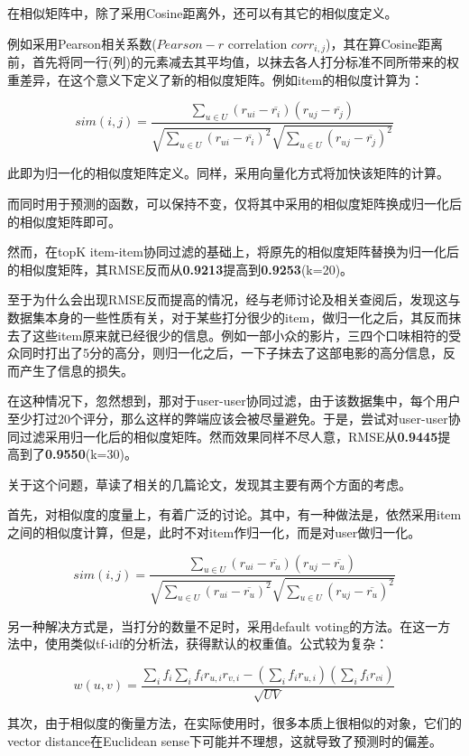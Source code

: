 \documentclass[utf8, a4paper, 11pt, onecolumn]{ctexart}
\begin{document}
\begin{spacing}{1.3}
在相似矩阵中，除了采用Cosine距离外，还可以有其它的相似度定义。

例如采用Pearson相关系数($Pearson-r$ correlation $corr_{i,j}$)\cite{sarwar2001item}，其在算Cosine距离前，首先将同一行(列)的元素减去其平均值，以抹去各人打分标准不同所带来的权重差异，在这个意义下定义了新的相似度矩阵。例如item的相似度计算为：

\[sim(i,j) = \frac{\sum_{u \in U} (r_{ui}-\overline{r_{i}})  (r_{uj}-\overline{r_{j}})} {\sqrt{\sum_{u \in U} (r_{ui}-\overline{r_{i}})^2} \sqrt{\sum_{u \in U} (r_{uj}-\overline{r_{j}})^2}}\]

此即为归一化的相似度矩阵定义。同样，采用向量化方式将加快该矩阵的计算。

而同时用于预测的函数，可以保持不变，仅将其中采用的相似度矩阵换成归一化后的相似度矩阵即可。

然而，在topK item-item协同过滤的基础上，将原先的相似度矩阵替换为归一化后的相似度矩阵，其RMSE反而从\textbf{0.9213}提高到\textbf{0.9253}(k=20)。

至于为什么会出现RMSE反而提高的情况，经与老师讨论及相关查阅后，发现这与数据集本身的一些性质有关，对于某些打分很少的item，做归一化之后，其反而抹去了这些item原来就已经很少的信息。例如一部小众的影片，三四个口味相符的受众同时打出了5分的高分，则归一化之后，一下子抹去了这部电影的高分信息，反而产生了信息的损失。

在这种情况下，忽然想到，那对于user-user协同过滤，由于该数据集中，每个用户至少打过20个评分，那么这样的弊端应该会被尽量避免。于是，尝试对user-user协同过滤采用归一化后的相似度矩阵。然而效果同样不尽人意，RMSE从\textbf{0.9445}提高到了\textbf{0.9550}(k=30)。

关于这个问题，草读了相关的几篇论文，发现其主要有两个方面的考虑。

首先，对相似度的度量上，有着广泛的讨论。其中，有一种做法是，依然采用item之间的相似度计算，但是，此时不对item作归一化，而是对user做归一化\cite{sarwar2001item}。

\[sim(i,j) = \frac{\sum_{u \in U} (r_{ui}-\overline{r_{u}})  (r_{uj}-\overline{r_{u}})} {\sqrt{\sum_{u \in U} (r_{ui}-\overline{r_{u}})^2} \sqrt{\sum_{u \in U} (r_{uj}-\overline{r_{u}})^2}}\]

另一种解决方式是，当打分的数量不足时，采用default voting的方法\cite{breese1998empirical}。在这一方法中，使用类似tf-idf的分析法，获得默认的权重值。公式较为复杂：

\[w(u,v) = \frac{\sum_{i} f_{i} \sum_{i} f_{i} r_{u,i} r_{v,i} - (\sum_i f_i r_{u,i}) (\sum_i f_i r_{vi}) }{\sqrt{UV}}\]

其次，由于相似度的衡量方法，在实际使用时，很多本质上很相似的对象，它们的vector distance在Euclidean sense下可能并不理想\cite{sarwar2001item}，这就导致了预测时的偏差。


\end{spacing}
\end{document}
